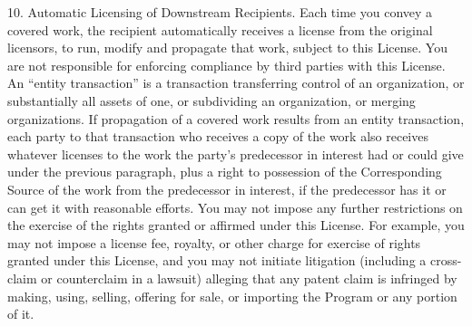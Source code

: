 \documentclass {book}
\begin{document}
\begin{tiny}
10. Automatic Licensing of Downstream Recipients. Each time you convey a covered work, the recipient automatically receives a license from the original licensors, to run, modify and propagate that work, subject to this License. You are not responsible for enforcing compliance by third parties with this License. An ``entity transaction'' is a transaction transferring control of an organization, or substantially all assets of one, or subdividing an organization, or merging organizations. If propagation of a covered work results from an entity transaction, each party to that transaction who receives a copy of the work also receives whatever licenses to the work the party's predecessor in interest had or could give under the previous paragraph, plus a right to possession of the Corresponding Source of the work from the predecessor in interest, if the predecessor has it or can get it with reasonable efforts. You may not impose any further restrictions on the exercise of the rights granted or affirmed under this License. For example, you may not impose a license fee, royalty, or other charge for exercise of rights granted under this License, and you may not initiate litigation (including a cross-claim or counterclaim in a lawsuit) alleging that any patent claim is infringed by making, using, selling, offering for sale, or importing the Program or any portion of it.


\end{tiny}
\end{document}
